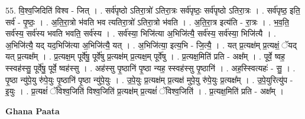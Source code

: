 \documentclass[17pt]{extarticle}
\begin{document}
55. वि॒श्व॒जिदिति॑ विश्व - जित् । . सर्व॑पृष्ठो ऽतिरा॒त्रो॑ ऽतिरा॒त्रः सर्व॑पृष्ठः॒ सर्व॑पृष्ठो ऽतिरा॒त्रः । . सर्व॑पृष्ठ॒ इति॒ सर्व॑ - पृ॒ष्ठः॒ । . अ॒ति॒रा॒त्रो भ॑वति भव त्यतिरा॒त्रो॑ ऽतिरा॒त्रो भ॑वति । . अ॒ति॒रा॒त्र इत्य॑ति - रा॒त्रः । . भ॒व॒ति॒ सर्व॑स्य॒ सर्व॑स्य भवति भवति॒ सर्व॑स्य । . सर्व॑स्या॒ भिजि॑त्या अ॒भिजि॑त्यै॒ सर्व॑स्य॒ सर्व॑स्या॒ भिजि॑त्यै । . अ॒भिजि॑त्यै॒ यद् यद॒भिजि॑त्या अ॒भिजि॑त्यै॒ यत् । . अ॒भिजि॑त्या॒ इत्य॒भि - जि॒त्यै॒ । . यत् प्र॒त्यक्ष॑म् प्र॒त्यक्षं॒ ॅयद् यत् प्र॒त्यक्ष᳚म् । . प्र॒त्यक्ष॒म् पूर्वे॑षु॒ पूर्वे॑षु प्र॒त्यक्ष॑म् प्र॒त्यक्ष॒म् पूर्वे॑षु । . प्र॒त्यक्ष॒मिति॑ प्रति - अक्ष᳚म् । . पूर्वे॒ ष्वह॒ स्स्वह॑स्सु॒ पूर्वे॑षु॒ पूर्वे॒ ष्वह॑स्सु । . अह॑स्सु पृ॒ष्ठानि॑ पृ॒ष्ठा न्यह॒ स्स्वह॑स्सु पृ॒ष्ठानि॑ । . अह॒स्स्वित्यहः॑ - सु॒ । . पृ॒ष्ठा न्यु॑पे॒यु रु॑पे॒युः पृ॒ष्ठानि॑ पृ॒ष्ठा न्यु॑पे॒युः । . उ॒पे॒युः प्र॒त्यक्ष॑म् प्र॒त्यक्ष॑ मुपे॒यु रु॑पे॒युः प्र॒त्यक्ष᳚म् । . उ॒पे॒युरित्यु॑प - इ॒युः । . प्र॒त्यक्षं॑ ॅविश्व॒जिति॑ विश्व॒जिति॑ प्र॒त्यक्ष॑म् प्र॒त्यक्षं॑ ॅविश्व॒जिति॑ । . प्र॒त्यक्ष॒मिति॑ प्रति - अक्ष᳚म् । \newline

\textbf{Ghana Paata } \newline
\end{document}
